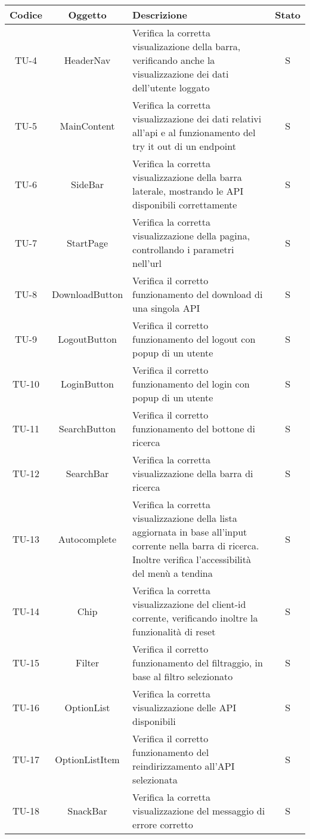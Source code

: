 \begin{center}
  \label{tab:test-unita-componenti}
  \begin{longtable}{|c|c|p{}|c|}
  \hline
  \textbf{Codice} & \textbf{Oggetto} & \textbf{Descrizione} & \textbf{Stato}\\
  \hline
  TU-4 &HeaderNav &Verifica la corretta visualizazione della barra, verificando anche la visualizzazione dei dati dell'utente loggato  &S \\
  \hline
  TU-5 &MainContent &Verifica la corretta visualizzazione dei dati relativi all'api e al funzionamento del try it out di un endpoint &S \\
  \hline
  TU-6 &SideBar &Verifica la corretta visualizzazione della barra laterale, mostrando le API disponibili correttamente &S \\
  \hline
  TU-7 &StartPage &Verifica la corretta visualizzazione della pagina, controllando i parametri nell'url &S \\
  \hline
  TU-8 &DownloadButton &Verifica il corretto funzionamento del download di una singola API &S \\
  \hline
  TU-9 &LogoutButton &Verifica il corretto funzionamento del logout con popup di un utente &S \\
  \hline
  TU-10 &LoginButton &Verifica il corretto funzionamento del login con popup di un utente &S \\
  \hline
  TU-11 &SearchButton &Verifica il corretto funzionamento del bottone di ricerca &S \\
  \hline
  TU-12 &SearchBar &Verifica la corretta visualizzazione della barra di ricerca &S \\
  \hline
  TU-13 &Autocomplete &Verifica la corretta visualizzazione della lista aggiornata in base all'input corrente nella barra di ricerca. Inoltre verifica l'accessibilità del menù a tendina  &S \\
  \hline
  TU-14 &Chip &Verifica la corretta visualizzazione del client-id corrente, verificando inoltre la funzionalità di reset &S \\
  \hline
  TU-15 &Filter &Verifica il corretto funzionamento del filtraggio, in base al filtro selezionato &S \\
  \hline
  TU-16 &OptionList &Verifica la corretta visualizzazione delle API disponibili &S \\
  \hline
  TU-17 &OptionListItem &Verifica il corretto funzionamento del reindirizzamento all'API selezionata &S \\
  \hline
  TU-18 &SnackBar &Verifica la corretta visualizzazione del messaggio di errore corretto &S \\
  \hline
\end{longtable}
\end{center}

